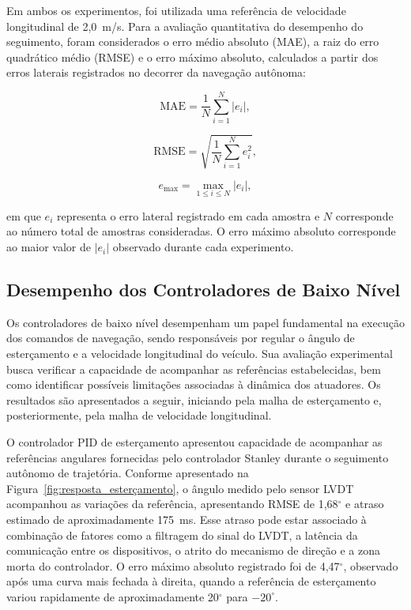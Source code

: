 Em ambos os experimentos, foi utilizada uma referência de velocidade longitudinal de 2,0~m/s. Para a avaliação quantitativa do desempenho do seguimento, foram considerados o erro médio absoluto (MAE), a raiz do erro quadrático médio (RMSE) e o erro máximo absoluto, calculados a partir dos erros laterais registrados no decorrer da navegação autônoma:

\begin{equation}
    \mathrm{MAE} = \frac{1}{N}\sum_{i=1}^{N}|e_i|,
    \label{eq:mae}
\end{equation}

\begin{equation}
    \mathrm{RMSE} = \sqrt{\frac{1}{N}\sum_{i=1}^{N}e_i^2},
    \label{eq:rmse}
\end{equation}

\begin{equation}
    e_{\mathrm{max}} = \max_{1 \leq i \leq N}|e_i|,
    \label{eq:erro_maximo}
\end{equation}

em que $e_i$ representa o erro lateral registrado em cada amostra e $N$ corresponde ao número total de amostras consideradas. O erro máximo absoluto corresponde ao maior valor de $|e_i|$ observado durante cada experimento.


\subsection{Desempenho dos Controladores de Baixo Nível}
\label{subsec:resultados_baixo_nivel}

Os controladores de baixo nível desempenham um papel fundamental na execução dos comandos de navegação, sendo responsáveis por regular o ângulo de esterçamento e a velocidade longitudinal do veículo. Sua avaliação experimental busca verificar a capacidade de acompanhar as referências estabelecidas, bem como identificar possíveis limitações associadas à dinâmica dos atuadores. Os resultados são apresentados a seguir, iniciando pela malha de esterçamento e, posteriormente, pela malha de velocidade longitudinal.

O controlador PID de esterçamento apresentou capacidade de acompanhar as referências angulares fornecidas pelo controlador Stanley durante o seguimento autônomo de trajetória. Conforme apresentado na Figura~\ref{fig:resposta_esterçamento}, o ângulo medido pelo sensor LVDT acompanhou as variações da referência, apresentando RMSE de 1,68$^\circ$ e atraso estimado de aproximadamente 175~ms. Esse atraso pode estar associado à combinação de fatores como a filtragem do sinal do LVDT, a latência da comunicação entre os dispositivos, o atrito do mecanismo de direção e a zona morta do controlador. O erro máximo absoluto registrado foi de 4,47$^\circ$, observado após uma curva mais fechada à direita, quando a referência de esterçamento variou rapidamente de aproximadamente 20$^\circ$ para $-20^\circ$.

